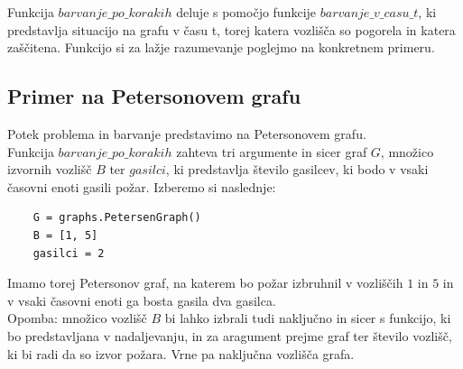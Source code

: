 \documentclass[a4paper, 12pt]{article}
\begin{document}
\noindent Funkcija $barvanje\_po\_korakih$ deluje s pomočjo funkcije $barvanje\_v\_casu\_t$, ki predstavlja
situacijo na grafu v času t, torej katera vozlišča so pogorela in katera zaščitena.
 Funkcijo si za lažje razumevanje poglejmo na konkretnem primeru.

\subsection{Primer na Petersonovem grafu}
\noindent Potek problema in barvanje predstavimo na Petersonovem grafu. \\ 
Funkcija $barvanje\_po\_korakih$ zahteva tri argumente
in sicer graf $G$, množico izvornih vozlišč $B$ ter $gasilci$, ki predstavlja število gasilcev, ki 
bodo v vsaki časovni enoti gasili požar.
Izberemo si naslednje:
\begin{small}
\begin{verbatim}
    G = graphs.PetersenGraph()
    B = [1, 5]
    gasilci = 2
\end{verbatim}
\end{small}
Imamo torej Petersonov graf, na katerem bo požar izbruhnil v vozliščih $1$ in $5$ in v vsaki časovni enoti ga bosta
gasila dva gasilca. \\
Opomba: množico vozlišč $B$ bi lahko izbrali tudi naključno in sicer s funkcijo, ki bo predstavljana
v nadaljevanju, in za aragument prejme graf ter število vozlišč, ki bi radi da so izvor požara. 
Vrne pa naključna vozlišča grafa. \\
\end{document}
